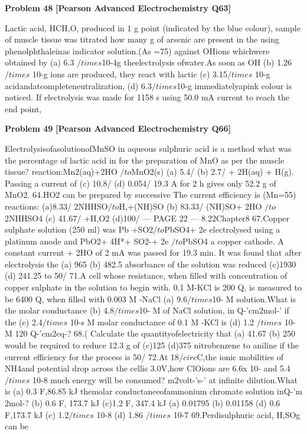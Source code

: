 \begin{problembox}
\textbf{Problem 48} \hfill \textbf{[Pearson Advanced Electrochemistry Q63]}
\label{q:ext-pearson-48}

Lactic acid, HCH,O, produced in 1 g
point (indicated by the blue colour),
sample of muscle tissue was titrated
how many g of arsenic are present in the
using phenolphthaleinas indicator
solution.(As =75)
against OHions whichwere obtained by
(a) 6.3 $/times$10-4g
theelectrolysis ofwater.As soon as OH
(b) 1.26$/times$ 10-g
ions are produced, they react with lactic
(c) 3.15$/times$ 10-g
acidandatcompleteneutralization,
(d) 6.3$/times$10-g
immediatelyapink colour is noticed.
If electrolysis was made for 1158 s using
50.0 mA current to reach the end point,
\end{problembox}

\begin{problembox}
\textbf{Problem 49} \hfill \textbf{[Pearson Advanced Electrochemistry Q66]}
\label{q:ext-pearson-49}

ElectrolysisofasolutionofMnSO
in aqueous sulphuric acid is a method
what was the percentage of lactic acid in
for the preparation of MnO as per the
muscle tissue?
reaction:Mn$2$(aq)+2HO $/to$MnO2(s)
(a) 5.4/%
(b) 2.7/%
+ 2H(aq) + H(g). Passing a current of
(c) 10.8/%
(d) 0.054/%
19.3 A for 2 h gives only 52.2 g of MnO2.
64.HO2 can be prepared by successive
The current efficiency is (Mn=55)
reactions:
(a)8.33/%
2NHHSO$/to$H,+(NH)SO
(b) 83.33/%
(NH)SO+ 2HO $/to$ 2NHHSO4
(c) 41.67/%
+H,O2
(d)100/%
--- PAGE 22 ---
8.22Chapter8
67.Copper sulphate solution (250 ml) was
Pb +SO$2$$/to$PbSO4+ 2e
electrolysed using a platinum anode and
PbO2+ 4H*+ SO$2$-+ 2e $/to$PbSO4
a copper cathode. A constant current
+ 2HO
of 2 mA was passed for 19.3 min. It
was found that after electrolysis the
(a) 965
(b) 482.5
absorbance of the solution was reduced
(c)1930
(d) 241.25
to 50/%
71.A cell whose resistance, when filled with
concentration of copper sulphate in the
solution to begin with.
0.1 M-KCl is 200 Q, is measured to be
6400 Q, when filled with 0.003 M -NaCl
(a) 9.6$/times$10- M
solution.What is the molar conductance
(b) 4.8$/times$10- M
of NaCl solution, in Q-'cm$2$mol-' if the
(c) 2.4$/times$ 10-s M
molar conductance of 0.1 M -KCl is
(d) 1.2 $/times$ 10- M
120 Q-'cm$2$eq-?
68.(
Calculate the quantityofelectricity that
(a) 41.67
(b) 250
would be required to reduce 12.3 g of
(c)125
(d)375
nitrobenzene to aniline if the current
efficiency for the process is 50/%
72.At 18$/circ$C,the ionic mobilities of NH4and
potential drop across the cellis 3.0V,how
ClOions are 6.6x 10- and 5.4 $/times$ 10-8
much energy will be consumed?
m$2$volt-'s-' at infinite dilution.What is
(a) 0.3 F,86.85 kJ
themolar conductanceofammonium
chromate solution inQ-'m$2$mol-?
(b) 0.6 F, 173.7 kJ
(c)1.2 F, 347.4 kJ
(a) 0.01795
(b) 0.01158
(d) 0.6 F,173.7 kJ
(c) 1.2$/times$ 10-8
(d) 1.86 $/times$ 10-7
69.Perdisulphuric acid, H,SOg can be
\end{problembox}

